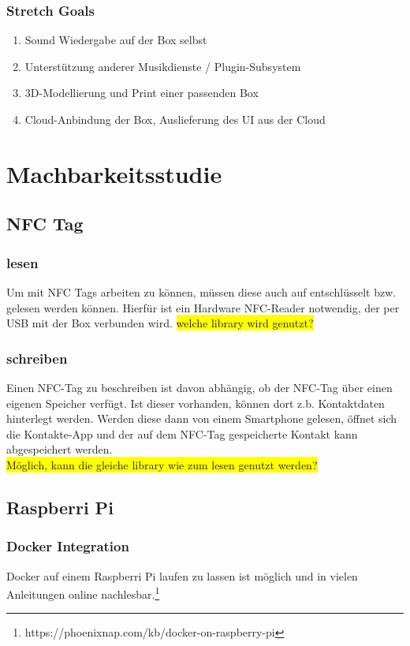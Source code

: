 \documentclass[10pt, a4paper, draft]{article}
\begin{document}
\subsubsection{Stretch Goals}
\begin{enumerate}
  \item Sound Wiedergabe auf der Box selbst
  \item Unterstützung anderer Musikdienste / Plugin-Subsystem
  \item 3D-Modellierung und Print einer passenden Box
  \item Cloud-Anbindung der Box, Auslieferung des UI aus der Cloud
\end{enumerate}

\section{Machbarkeitsstudie}

\subsection{NFC Tag}
\subsubsection{lesen}
Um mit NFC Tags arbeiten zu können, müssen diese auch auf entschlüsselt bzw. gelesen werden können.
Hierfür ist ein Hardware NFC-Reader notwendig, der per USB mit der Box verbunden wird.
\colorbox{yellow}{welche library wird genutzt?}

\subsubsection{schreiben}
Einen NFC-Tag zu beschreiben ist davon abhängig, ob der NFC-Tag über einen eigenen Speicher verfügt.
Ist dieser vorhanden, können dort z.b. Kontaktdaten hinterlegt werden. Werden diese dann von einem Smartphone gelesen, öffnet sich die Kontakte-App und der auf dem NFC-Tag gespeicherte Kontakt kann abgespeichert werden.
\\
\colorbox{yellow}{Möglich, kann die gleiche library wie zum lesen genutzt werden?}

\subsection{Raspberri Pi}
\subsubsection{Docker Integration}
Docker auf einem Raspberri Pi laufen zu lassen ist möglich und in vielen Anleitungen online nachlesbar.\footnote{https://phoenixnap.com/kb/docker-on-raspberry-pi}
\end{document}
